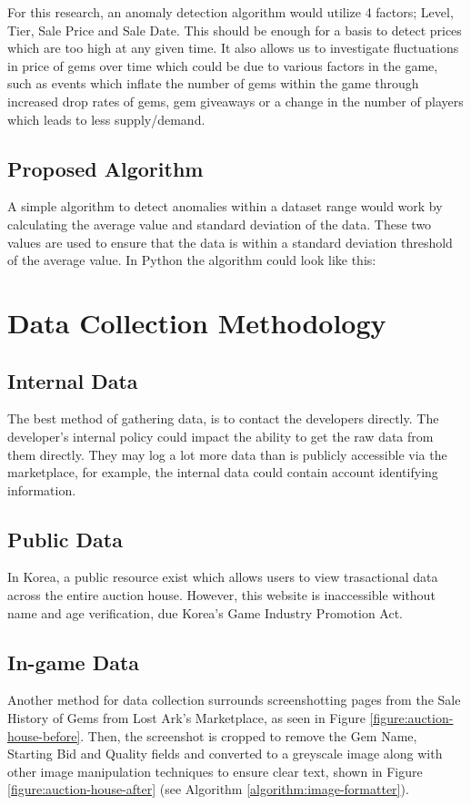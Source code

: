 \documentclass[journal]{IEEEtran}
\begin{document}
For this research, an anomaly detection algorithm would utilize 4 factors; Level, Tier, Sale Price and Sale Date. This should be enough for a basis to detect prices which are too high at any given time. It also allows us to investigate fluctuations in price of gems over time which could be due to various factors in the game, such as events which inflate the number of gems within the game through increased drop rates of gems, gem giveaways or a change in the number of players which leads to less supply/demand.

\subsection{Proposed Algorithm}
\noindent A simple algorithm to detect anomalies within a dataset range would work by calculating the average value and standard deviation of the data. These two values are used to ensure that the data is within a standard deviation threshold of the average value. In Python the algorithm could look like this:


\section{Data Collection Methodology}
\subsection{Internal Data}
\noindent The best method of gathering data, is to contact the developers directly. The developer's internal policy could impact the ability to get the raw data from them directly. They may log a lot more data than is publicly accessible via the marketplace, for example, the internal data could contain account identifying information.

\subsection{Public Data}
\noindent In Korea, a public resource exist which allows users to view trasactional data across the entire auction house\cite{LostArkStove2019}. However, this website is inaccessible without name and age verification, due Korea's Game Industry Promotion Act\cite{GIPA2020kr}.

\subsection{In-game Data}
\noindent Another method for data collection surrounds screenshotting pages from the Sale History of Gems from Lost Ark's Marketplace, as seen in Figure \ref{figure:auction-house-before}. Then, the screenshot is cropped to remove the Gem Name, Starting Bid and Quality fields and converted to a greyscale image along with other image manipulation techniques to ensure clear text, shown in Figure \ref{figure:auction-house-after} (see Algorithm \ref{algorithm:image-formatter}).
\end{document}
